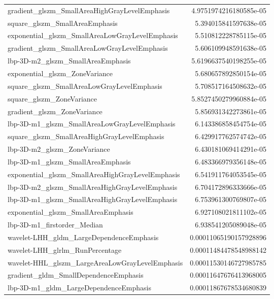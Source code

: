 {\begin{xltabular}[H]{\textwidth}{X r}
        gradient\_glszm\_SmallAreaHighGrayLevelEmphasis & 4.9751974216180585e-05 \\
        square\_glszm\_SmallAreaEmphasis & 5.394015841597638e-05 \\
        exponential\_glszm\_SmallAreaLowGrayLevelEmphasis & 5.510812228785115e-05 \\
        gradient\_glszm\_SmallAreaLowGrayLevelEmphasis & 5.606109948591638e-05 \\
        lbp-3D-m2\_glszm\_SmallAreaEmphasis & 5.6196637540198255e-05 \\
        exponential\_glszm\_ZoneVariance & 5.680657892850154e-05 \\
        square\_glszm\_SmallAreaLowGrayLevelEmphasis & 5.708517164508632e-05 \\
        square\_glszm\_ZoneVariance & 5.8527450279960884e-05 \\
        gradient\_glszm\_ZoneVariance & 5.856931342273861e-05 \\
        lbp-3D-m1\_glszm\_SmallAreaLowGrayLevelEmphasis & 6.143386858454754e-05 \\
        square\_glszm\_SmallAreaHighGrayLevelEmphasis & 6.429917762574742e-05 \\
        lbp-3D-m2\_glszm\_ZoneVariance & 6.430181069414291e-05 \\
        lbp-3D-m1\_glszm\_SmallAreaEmphasis & 6.483366979356148e-05 \\
        exponential\_glszm\_SmallAreaHighGrayLevelEmphasis & 6.541911764053545e-05 \\
        lbp-3D-m2\_glszm\_SmallAreaHighGrayLevelEmphasis & 6.704172896333666e-05 \\
        lbp-3D-m1\_glszm\_SmallAreaHighGrayLevelEmphasis & 6.753961300769807e-05 \\
        exponential\_glszm\_SmallAreaEmphasis & 6.927108021811102e-05 \\
        lbp-3D-m1\_firstorder\_Median & 6.938541205089048e-05 \\
        wavelet-LHH\_gldm\_LargeDependenceEmphasis & 0.00011065190157928896 \\
        wavelet-LHH\_glrlm\_RunPercentage & 0.00011484478548988142 \\
        wavelet-HHL\_glszm\_LargeAreaLowGrayLevelEmphasis & 0.00011530146727985785 \\
        gradient\_gldm\_SmallDependenceEmphasis & 0.00011647676413968005 \\
        lbp-3D-m1\_gldm\_LargeDependenceEmphasis & 0.00011867678534680839 \\

\end{xltabular}}
